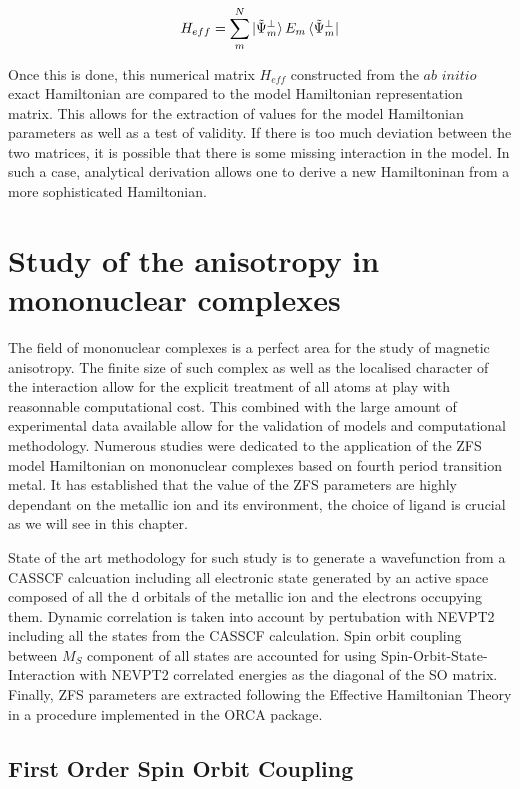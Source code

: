 \documentclass[10pt]{report}
\numberwithin{equation}{section}
\begin{document}
\begin{equation}
    H_{eff}=\sum_{m}^{N}\ket{\tilde{\Psi}_m^{\bot}}E_m \bra{\tilde{\Psi}_m^{\bot}}
\end{equation}

Once this is done, this numerical matrix $H_{eff}$ constructed from the $\textit{ab}$ $\textit{initio}$ exact Hamiltonian are compared to the model Hamiltonian representation matrix. 
This allows for the extraction of values for the model Hamiltonian parameters as well as a test of validity.
If there is too much deviation between the two matrices, it is possible that there is some missing interaction in the model.
In such a case, analytical derivation allows one to derive a new Hamiltoninan from a more sophisticated Hamiltonian.

\chapter{Study of the anisotropy in mononuclear complexes}

The field of mononuclear complexes is a perfect area for the study of magnetic anisotropy. 
The finite size of such complex as well as the localised character of the interaction allow for the explicit treatment of all atoms at play with reasonnable computational cost.
This combined with the large amount of experimental data available allow for the validation of models and computational methodology.
Numerous studies were dedicated to the application of the ZFS model Hamiltonian on mononuclear complexes based on fourth period transition metal.
It has established that the value of the ZFS parameters are highly dependant on the metallic ion and its environment, the choice of ligand is crucial as we will see in this chapter.
\par State of the art methodology for such study is to generate a wavefunction from a CASSCF calcuation including all electronic state generated by an active space composed of all the d orbitals of the metallic ion and the electrons occupying them. 
Dynamic correlation is taken into account by pertubation with NEVPT2 including all the states from the CASSCF calculation. 
Spin orbit coupling between $M_S$ component of all states are accounted for using Spin-Orbit-State-Interaction with NEVPT2 correlated energies as the diagonal of the SO matrix.
Finally, ZFS parameters are extracted following the Effective Hamiltonian Theory in a procedure implemented in the ORCA package.

\section{First Order Spin Orbit Coupling}
\end{document}
